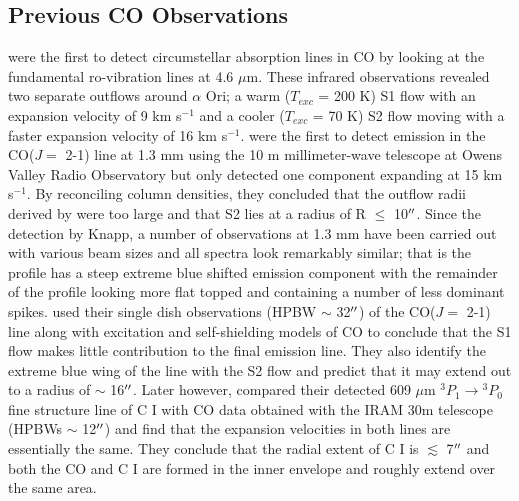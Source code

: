 \documentclass[iop]{emulateapj}
\begin{document}
\subsection{Previous CO Observations}
\cite{1979ApJ...233L.135B} were the first to detect circumstellar absorption lines in CO by looking at the fundamental ro-vibration lines at 4.6 $\mu$m. These infrared observations revealed two separate outflows around $\alpha$ Ori; a warm (\rm{$T_{exc}$} = 200 K) S1 flow with an expansion velocity of 9 km s${}^{-1}$ and a cooler (\rm{$T_{exc}$} = 70 K) S2 flow moving with a faster expansion velocity of 16 km s${}^{-1}$.   \cite{1980ApJ...242L..25K} were the first to detect emission in the CO($J=$ 2-1) line at 1.3 mm using the 10 m millimeter-wave telescope at Owens Valley Radio Observatory but only detected one component expanding at 15 km s${}^{-1}$. By reconciling column densities, they concluded that the outflow radii derived by \cite{1979ApJ...233L.135B} were too large and that S2 lies at a radius of R $\leq$ 10$\mbox{$^{\prime\prime}$}$. Since the detection by Knapp, a number of observations at 1.3 mm have been carried out with various beam sizes and all spectra look remarkably similar; that is the profile has a steep extreme blue shifted emission component with the remainder of the profile looking more flat topped and containing a number of less dominant spikes. \cite{1987ApJ...313..400H} used their single dish observations (HPBW $\sim$ 32$\mbox{$^{\prime\prime}$}$) of the CO($J=$ 2-1) line along with excitation and self-shielding models of CO to conclude that the S1 flow makes little contribution to the final emission line. They also identify the extreme blue wing of the line with the S2 flow and predict that it may extend out to a radius of $\sim$ 16$\mbox{$^{\prime\prime}$}$. Later however, \cite{1994ApJ...424L.127H} compared their detected 609 $\mu$m ${}^3P{}_1\rightarrow{}^3P{}_0$ fine structure line of C I with CO data obtained with the IRAM 30m telescope (HPBWs $\sim$ 12$\mbox{$^{\prime\prime}$}$) and find that the expansion velocities in both lines are essentially the same. They conclude that the radial extent of C I is $\lesssim$ 7$\mbox{$^{\prime\prime}$}$ and both the CO and C I are formed in the inner envelope and roughly extend over the same area.  
\end{document}
